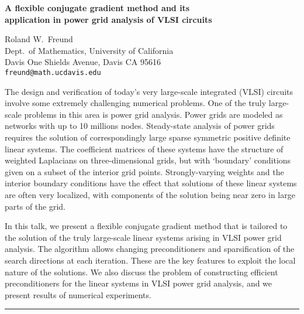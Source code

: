 \documentclass[twosided]{report}
\begin{document}
\begin{center}
{\large			%
{\bf A flexible conjugate gradient method and its \\
application in power grid analysis of VLSI circuits}}

	Roland W.~Freund \\
	Dept.~of Mathematics, University of California \\
	Davis One Shields Avenue, Davis CA 95616 \\
	{\tt freund@math.ucdavis.edu}
\end{center}
The design and verification of today's very large-scale
integrated (VLSI) circuits involve some extremely
challenging numerical problems. One of the truly large-scale
problems in this area is power grid analysis. Power grids
are modeled as networks with up to 10 millions nodes.
Steady-state analysis of power grids requires the solution
of correspondingly large sparse symmetric positive definite
linear systems. The coefficient matrices of these systems
have the structure of weighted Laplacians on
three-dimensional grids, but with `boundary' conditions
given on a subset of the interior grid points.
Strongly-varying weights and the interior boundary
conditions have the effect that solutions of these linear
systems are often very localized, with components of the
solution being near zero in large parts of the grid.

In this
talk, we present a flexible conjugate gradient method that
is tailored to the solution of the truly large-scale linear
systems arising in VLSI power grid analysis. The algorithm
allows changing preconditioners and sparsification of the
search directions at each iteration. These are the key
features to exploit the local nature of the solutions. We
also discuss the problem of constructing efficient
preconditioners for the linear systems in VLSI power grid
analysis, and we present results of numerical experiments.


	\begin{center} \rule{6in}{1pt} \end{center}
\end{document}
